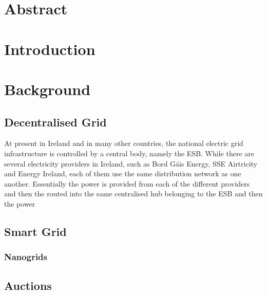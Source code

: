 \documentclass[a4paper, notitlepage]{report}
\author{Brian McNestry}
\date{\today}
\title{}
\begin{document}
\inserttitlepage


\declaration

\permissiontolend

\insertabstract

\acknowledgements

\tableofcontents

\newpage



\part{Abstract}
\label{sec:org4184179}

\part{Introduction}
\label{sec:org963b2a3}


\part{Background}
\label{sec:orgbd34d55}
\chapter{Decentralised Grid}
\label{sec:org0c9d95f}
At present in Ireland and in many other countries, the national electric grid
infrastructure is controlled by a central body, namely the ESB. While there are
several electricity providers in Ireland, such as Bord Gáis Energy, SSE
Airtricity and Energy Ireland, each of them use the same distribution network as
one another. Essentially the power is provided from each of the different
providers and then the routed into the same centralised hub belonging to the ESB
and then the power  
\chapter{Smart Grid}
\label{sec:orgab291cb}

\section{Nanogrids}
\label{sec:org3acac4a}

\chapter{Auctions}
\label{sec:org094cd6c}
\end{document}
